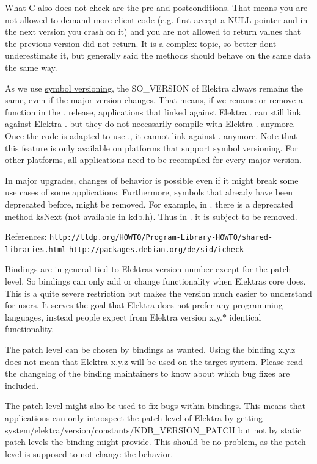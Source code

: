 What C also does not check are the pre and postconditions. That means you are not allowed to demand more client code (e.\+g. first accept a N\+U\+LL pointer and in the next version you crash on it) and you are not allowed to return values that the previous version did not return. It is a complex topic, so better don\textquotesingle{}t underestimate it, but generally said the methods should behave on the same data the same way.

As we use \hyperlink{doc_dev_symbol-versioning_md}{symbol versioning}, the S\+O\+\_\+\+V\+E\+R\+S\+I\+ON of Elektra always remains the same, even if the major version changes. That means, if we rename or remove a function in the {.} release, applications that linked against Elektra {.} can still link against Elektra {.} but they do not necessarily compile with Elektra {.} anymore. Once the code is adapted to use {.}, it cannot link against {.} anymore. Note that this feature is only available on platforms that support symbol versioning. For other platforms, all applications need to be recompiled for every major version.

In major upgrades, changes of behavior is possible even if it might break some use cases of some applications. Furthermore, symbols that already have been deprecated before, might be removed. For example, in {.} there is a deprecated method {\ttfamily ks\+Next} (not available in {\ttfamily kdb.\+h}). Thus in {.} it is subject to be removed.

References\+: \href{http://tldp.org/HOWTO/Program-Library-HOWTO/shared-libraries.html}{\tt http\+://tldp.\+org/\+H\+O\+W\+T\+O/\+Program-\/\+Library-\/\+H\+O\+W\+T\+O/shared-\/libraries.\+html} \href{http://packages.debian.org/de/sid/icheck}{\tt http\+://packages.\+debian.\+org/de/sid/icheck}

Bindings are in general tied to Elektra\textquotesingle{}s version number except for the patch level. So bindings can only add or change functionality when Elektra\textquotesingle{}s core does. This is a quite severe restriction but makes the version much easier to understand for users. It serves the goal that Elektra does not prefer any programming languages, instead people expect from Elektra version {\ttfamily x.\+y.$\ast$} identical functionality.

The patch level can be chosen by bindings as wanted. Using the binding {\ttfamily x.\+y.\+z} does not mean that Elektra {\ttfamily x.\+y.\+z} will be used on the target system. Please read the changelog of the binding maintainers to know about which bug fixes are included.

The patch level might also be used to fix bugs within bindings. This means that applications can only introspect the patch level of Elektra by getting {\ttfamily system/elektra/version/constants/\+K\+D\+B\+\_\+\+V\+E\+R\+S\+I\+O\+N\+\_\+\+P\+A\+T\+CH} but not by static patch levels the binding might provide. This should be no problem, as the patch level is supposed to not change the behavior. 